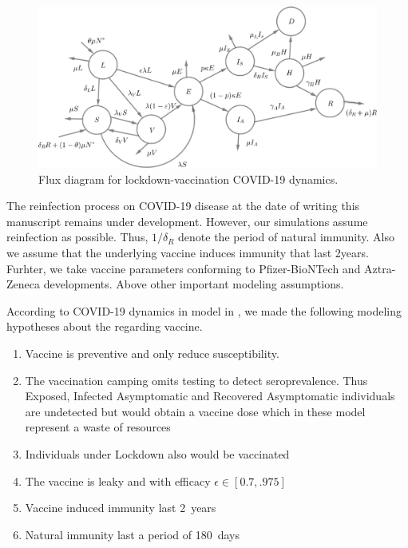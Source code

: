 \begin{figure}
    \centering
    \includegraphics[width=0.7\linewidth]{Figures/Diagrma_Vaccination}
    \caption{Flux diagram for lockdown-vaccination COVID-19 dynamics.}
    \label{fig:model_flux_diagram}
\end{figure}

The reinfection process on COVID-19
disease at the date of writing this manuscript remains under development.
However, our simulations assume reinfection as possible. Thus,
$1/\delta_R$ denote the period of natural immunity. Also we assume that
the underlying vaccine induces immunity that last \num{2}{years}. Furhter, we
take vaccine parameters conforming to Pfizer-BioNTech and Aztra-Zeneca
developments. Above other important modeling assumptions.

\begin{assumptions}
     According to COVID-19 dynamics in model in , we
     made the following modeling hypotheses about the regarding vaccine.
     \begin{enumerate}[(VH-1)]
        \item
            Vaccine is preventive and only reduce susceptibility.
        \item
            The vaccination camping omits testing to detect seroprevalence.
            Thus Exposed, Infected Asymptomatic and Recovered Asymptomatic
            individuals are undetected but would obtain a vaccine dose
            \textemdash which in these model represent a waste of resources
        \item
            Individuals under Lockdown also would be vaccinated
        \item
            The vaccine is leaky and with efficacy $\epsilon \in[0.7, .975]$
        \item
            Vaccine induced immunity last \SI{2}{years}
        \item
            Natural immunity last a period of \SI{180}{days}
     \end{enumerate}
\end{assumptions}

